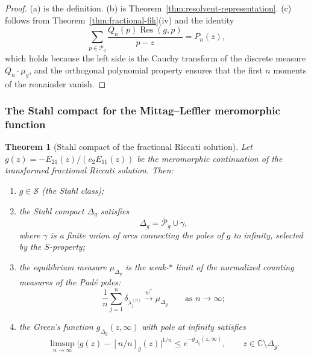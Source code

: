 \documentclass[11pt]{article}
\newtheorem{theorem}{Theorem}[section]
\theoremstyle{definition}
\theoremstyle{remark}
\DeclareMathOperator{\Res}{Res}
\begin{document}
\begin{proof}
(a) is the definition. (b) is Theorem~\ref{thm:resolvent-representation}. (c) follows from Theorem~\ref{thm:fractional-fik}(iv) and the identity
\begin{equation}
\sum_{p\in\mathcal{P}_{g}}\frac{Q_{n}(p)\Res(g,p)}{p-z}=P_{n}(z),
\label{eq:cauchy-numerator}
\end{equation}
which holds because the left side is the Cauchy transform of the discrete measure $Q_{n}\cdot\mu_{g}$, and the orthogonal polynomial property ensures that the first $n$ moments of the remainder vanish.
\end{proof}

\subsubsection{The Stahl compact for the Mittag--Leffler meromorphic function}
\label{sec:ml-stahl}

\begin{theorem}[Stahl compact of the fractional Riccati solution]
\label{thm:ml-stahl}
Let $g(z)=-E_{21}(z)/(c_{2}E_{11}(z))$ be the meromorphic continuation of the transformed fractional Riccati solution. Then:
\begin{enumerate}[label=(\roman*)]
\item $g\in\mathcal{S}$ (the Stahl class);
\item the Stahl compact $\Delta_{g}$ satisfies
\begin{equation}
\Delta_{g}=\overline{\mathcal{P}}_{g}\cup\gamma,
\label{eq:ml-stahl-compact}
\end{equation}
where $\gamma$ is a finite union of arcs connecting the poles of $g$ to infinity, selected by the $S$-property;
\item the equilibrium measure $\mu_{\Delta_{g}}$ is the weak-$\ast$ limit of the normalized counting measures of the Pad\'e poles:
\begin{equation}
\frac{1}{n}\sum_{j=1}^{n}\delta_{\lambda_{j}^{(n)}}\xrightarrow{w^{\ast}}\mu_{\Delta_{g}}
\qquad\text{as }n\to\infty;
\label{eq:ml-pole-condensation}
\end{equation}
\item the Green's function $g_{\Delta_{g}}(z,\infty)$ with pole at infinity satisfies
\begin{equation}
\limsup_{n\to\infty}\bigl|g(z)-[n/n]_{g}(z)\bigr|^{1/n}\le e^{-g_{\Delta_{g}}(z,\infty)},
\qquad z\in\mathbb{C}\setminus\Delta_{g}.
\label{eq:ml-rate}
\end{equation}
\end{enumerate}
\end{theorem}
\end{document}
